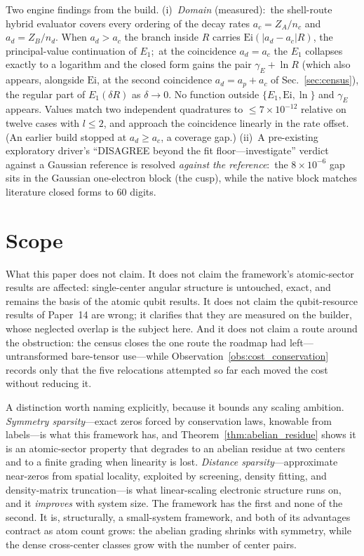 \documentclass[aps,pra,twocolumn,superscriptaddress,longbibliography]{revtex4-2}
\begin{document}
Two engine findings from the build.  (i)~\emph{Domain} (measured):\ the
shell-route hybrid evaluator covers every ordering of the decay rates
$a_c=Z_A/n_c$ and $a_d=Z_B/n_d$.  When $a_d>a_c$ the branch inside $R$ carries
$\mathrm{Ei}(|a_d-a_c|R)$, the principal-value continuation of $E_1$;\ at the
coincidence $a_d=a_c$ the $E_1$ collapses exactly to a logarithm and the closed
form gains the pair $\gamma_E+\ln R$ (which also appears, alongside $\mathrm{Ei}$, at the second
coincidence $a_d=a_p+a_c$ of Sec.~\ref{sec:census}), the regular part of $E_1(\delta R)$ as
$\delta\to0$.  No function outside $\{E_1,\mathrm{Ei},\ln\}$ and $\gamma_E$
appears.  Values match two independent quadratures to $\le7\times10^{-12}$
relative on twelve cases with $l\le2$, and approach the coincidence linearly in
the rate offset.  (An earlier build stopped at $a_d\ge a_c$, a coverage gap.)
(ii)~A pre-existing exploratory driver's ``DISAGREE beyond the fit
floor---investigate'' verdict against a Gaussian reference is resolved
\emph{against the reference}:\ the $8\times10^{-6}$ gap sits in the Gaussian
one-electron block (the cusp), while the native block matches literature
closed forms to $60$ digits.

\section{Scope}
\label{sec:scope}

What this paper does not claim.  It does not claim the framework's
atomic-sector results are affected: single-center angular structure is
untouched, exact, and remains the basis of the atomic qubit results.  It
does not claim the qubit-resource results of Paper~14 are wrong; it
clarifies that they are measured on the builder, whose neglected overlap
is the subject here.  And it does not claim a route around the
obstruction: the census closes the one route the roadmap had left---%
untransformed bare-tensor use---while
Observation~\ref{obs:cost_conservation} records only that the five
relocations attempted so far each moved the cost without reducing it.

A distinction worth naming explicitly, because it bounds any scaling
ambition.  \emph{Symmetry sparsity}---exact zeros forced by conservation
laws, knowable from labels---is what this framework has, and
Theorem~\ref{thm:abelian_residue} shows it is an atomic-sector property
that degrades to an abelian residue at two centers and to a finite
grading when linearity is lost.  \emph{Distance sparsity}---approximate
near-zeros from spatial locality, exploited by screening, density
fitting, and density-matrix truncation---is what linear-scaling
electronic structure runs on, and it \emph{improves} with system size.
The framework has the first and none of the second.  It is, structurally,
a small-system framework, and both of its advantages contract as atom
count grows: the abelian grading shrinks with symmetry, while the dense
cross-center classes grow with the number of center pairs.
\end{document}
